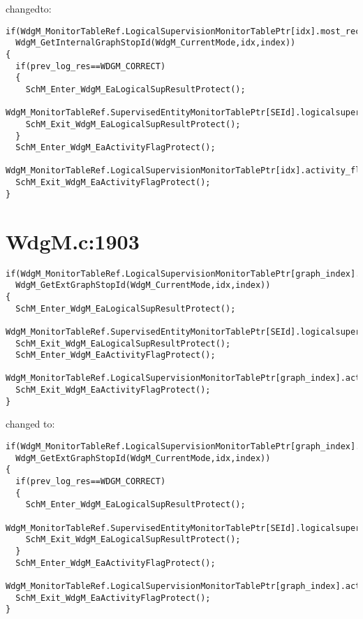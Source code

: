 \documentclass[11pt,a4paper]{article}
\begin{document}
changedto:

\begin{lstlisting}
if(WdgM_MonitorTableRef.LogicalSupervisionMonitorTablePtr[idx].most_recently_reported==
  WdgM_GetInternalGraphStopId(WdgM_CurrentMode,idx,index))
{
  if(prev_log_res==WDGM_CORRECT)
  {
    SchM_Enter_WdgM_EaLogicalSupResultProtect();
    WdgM_MonitorTableRef.SupervisedEntityMonitorTablePtr[SEId].logicalsupervision_result=WDGM_CORRECT;
    SchM_Exit_WdgM_EaLogicalSupResultProtect();
  }
  SchM_Enter_WdgM_EaActivityFlagProtect();
  WdgM_MonitorTableRef.LogicalSupervisionMonitorTablePtr[idx].activity_flag=FALSE;
  SchM_Exit_WdgM_EaActivityFlagProtect();
}
\end{lstlisting}

\newpage
\section{WdgM.c:1903}

\begin{lstlisting}
if(WdgM_MonitorTableRef.LogicalSupervisionMonitorTablePtr[graph_index].most_recently_reported==
  WdgM_GetExtGraphStopId(WdgM_CurrentMode,idx,index))
{
  SchM_Enter_WdgM_EaLogicalSupResultProtect();
  WdgM_MonitorTableRef.SupervisedEntityMonitorTablePtr[SEId].logicalsupervision_result=WDGM_CORRECT;
  SchM_Exit_WdgM_EaLogicalSupResultProtect();
  SchM_Enter_WdgM_EaActivityFlagProtect();
  WdgM_MonitorTableRef.LogicalSupervisionMonitorTablePtr[graph_index].activity_flag=FALSE;
  SchM_Exit_WdgM_EaActivityFlagProtect();
}
\end{lstlisting}

changed to:

\begin{lstlisting}
if(WdgM_MonitorTableRef.LogicalSupervisionMonitorTablePtr[graph_index].most_recently_reported==
  WdgM_GetExtGraphStopId(WdgM_CurrentMode,idx,index))
{
  if(prev_log_res==WDGM_CORRECT)
  {
    SchM_Enter_WdgM_EaLogicalSupResultProtect();
    WdgM_MonitorTableRef.SupervisedEntityMonitorTablePtr[SEId].logicalsupervision_result=WDGM_CORRECT;
    SchM_Exit_WdgM_EaLogicalSupResultProtect();
  }
  SchM_Enter_WdgM_EaActivityFlagProtect();
  WdgM_MonitorTableRef.LogicalSupervisionMonitorTablePtr[graph_index].activity_flag=FALSE;
  SchM_Exit_WdgM_EaActivityFlagProtect();
}
\end{lstlisting}

\newpage
\end{document}
